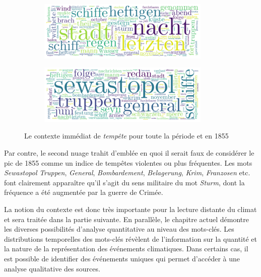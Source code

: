 \documentclass[a4paper,twoside,12pt]{article}
\begin{document}
\begin{figure}[h!]
\centering
\begin{subfigure}
    \centering
    \includegraphics[width=0.9\textwidth]{images/wordcloud_sturm.pdf}
\end{subfigure}
\begin{subfigure}
    \centering
    \includegraphics[width=0.9\textwidth]{images/wordcloud_sturm_1855.pdf}
\end{subfigure}
\caption{Le contexte immédiat de \textit{tempête} pour toute la période et en 1855}
\label{fig:sturm_wordclouds}
\end{figure}

Par contre, le second nuage trahit d'emblée en quoi il serait faux de considérer le pic de 1855 comme un indice de tempêtes violentes ou plus fréquentes. Les mots \textit{Sewastopol} \textit{Truppen}, \textit{General}, \textit{Bombardement}, \textit{Belagerung}, \textit{Krim}, \textit{Franzosen} etc. font clairement apparaître qu'il s'agit du sens militaire du mot \textit{Sturm}, dont la fréquence a été augmentée par la guerre de Crimée.

La notion du contexte est donc très importante pour la lecture distante du climat et sera traitée dans la partie suivante. En parallèle, le chapitre actuel démontre les diverses possibilités d'analyse quantitative au niveau des mots-clés. Les distributions temporelles des mots-clés révèlent de l'information sur la quantité et la nature de la représentation des événements climatiques. Dans certains cas, il est possible de identifier des événements uniques qui permet d'accéder à une analyse qualitative des sources.

\clearpage
\end{document}
